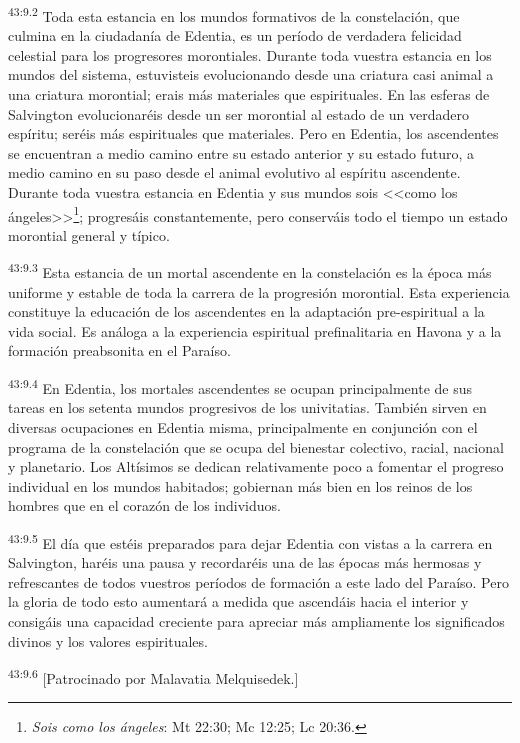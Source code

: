 \par
\textsuperscript{43:9.2} Toda esta estancia en los mundos formativos de la constelación, que culmina en la ciudadanía de Edentia, es un período de verdadera felicidad celestial para los progresores morontiales. Durante toda vuestra estancia en los mundos del sistema, estuvisteis evolucionando desde una criatura casi animal a una criatura morontial; erais más materiales que espirituales. En las esferas de Salvington evolucionaréis desde un ser morontial al estado de un verdadero espíritu; seréis más espirituales que materiales. Pero en Edentia, los ascendentes se encuentran a medio camino entre su estado anterior y su estado futuro, a medio camino en su paso desde el animal evolutivo al espíritu ascendente. Durante toda vuestra estancia en Edentia y sus mundos sois <<como los ángeles>>\footnote{\textit{Sois como los ángeles}: Mt 22:30; Mc 12:25; Lc 20:36.}; progresáis constantemente, pero conserváis todo el tiempo un estado morontial general y típico.

\par
\textsuperscript{43:9.3} Esta estancia de un mortal ascendente en la constelación es la época más uniforme y estable de toda la carrera de la progresión morontial. Esta experiencia constituye la educación de los ascendentes en la adaptación pre-espiritual a la vida social. Es análoga a la experiencia espiritual prefinalitaria en Havona y a la formación preabsonita en el Paraíso.

\par
\textsuperscript{43:9.4} En Edentia, los mortales ascendentes se ocupan principalmente de sus tareas en los setenta mundos progresivos de los univitatias. También sirven en diversas ocupaciones en Edentia misma, principalmente en conjunción con el programa de la constelación que se ocupa del bienestar colectivo, racial, nacional y planetario. Los Altísimos se dedican relativamente poco a fomentar el progreso individual en los mundos habitados; gobiernan más bien en los reinos de los hombres que en el corazón de los individuos.

\par
\textsuperscript{43:9.5} El día que estéis preparados para dejar Edentia con vistas a la carrera en Salvington, haréis una pausa y recordaréis una de las épocas más hermosas y refrescantes de todos vuestros períodos de formación a este lado del Paraíso. Pero la gloria de todo esto aumentará a medida que ascendáis hacia el interior y consigáis una capacidad creciente para apreciar más ampliamente los significados divinos y los valores espirituales.

\par
\textsuperscript{43:9.6} [Patrocinado por Malavatia Melquisedek.]